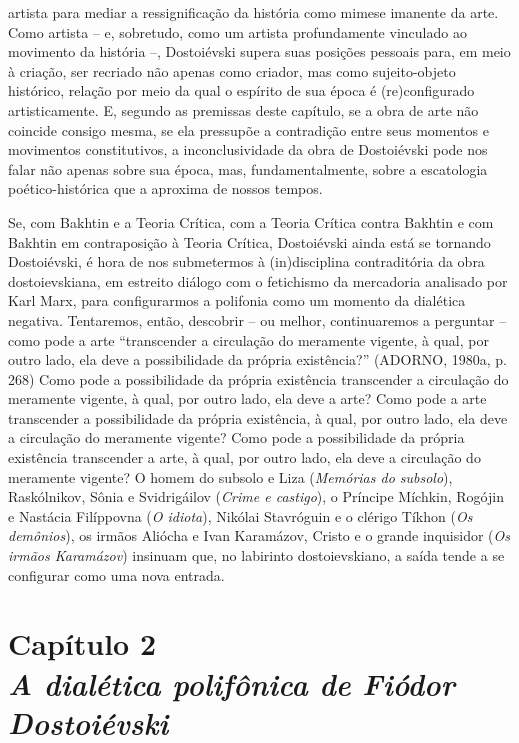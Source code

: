 artista para mediar a ressignificação da história como mimese imanente
da arte. Como artista -- e, sobretudo, como um artista profundamente
vinculado ao movimento da história --, Dostoiévski supera suas posições
pessoais para, em meio à criação, ser recriado não apenas como criador,
mas como sujeito-objeto histórico, relação por meio da qual o espírito
de sua época é (re)configurado artisticamente. E, segundo as premissas
deste capítulo, se a obra de arte não coincide consigo mesma, se ela
pressupõe a contradição entre seus momentos e movimentos constitutivos,
a inconclusividade da obra de Dostoiévski pode nos falar não apenas
sobre sua época, mas, fundamentalmente, sobre a escatologia
poético-histórica que a aproxima de nossos tempos.

Se, com Bakhtin e a Teoria Crítica, com a Teoria Crítica contra Bakhtin
e com Bakhtin em contraposição à Teoria Crítica, Dostoiévski ainda está
se tornando Dostoiévski, é hora de nos submetermos à (in)disciplina
contraditória da obra dostoievskiana, em estreito diálogo com o
fetichismo da mercadoria analisado por Karl Marx, para configurarmos a
polifonia como um momento da dialética negativa. Tentaremos, então,
descobrir -- ou melhor, continuaremos a perguntar -- como pode a arte
``transcender a circulação do meramente vigente, à qual, por outro lado,
ela deve a possibilidade da própria existência?'' (ADORNO, 1980a, p.
268) Como pode a possibilidade da própria existência transcender a
circulação do meramente vigente, à qual, por outro lado, ela deve a
arte? Como pode a arte transcender a possibilidade da própria
existência, à qual, por outro lado, ela deve a circulação do meramente
vigente? Como pode a possibilidade da própria existência transcender a
arte, à qual, por outro lado, ela deve a circulação do meramente
vigente? O homem do subsolo e Liza (\emph{Memórias do subsolo}),
Raskólnikov, Sônia e Svidrigáilov (\emph{Crime e castigo}), o Príncipe
Míchkin, Rogójin e Nastácia Filíppovna (\emph{O idiota}), Nikólai
Stavróguin e o clérigo Tíkhon (\emph{Os demônios}), os irmãos Aliócha e
Ivan Karamázov, Cristo e o grande inquisidor (\emph{Os irmãos
Karamázov}) insinuam que, no labirinto dostoievskiano, a saída tende a
se configurar como uma nova entrada.

\chapter*{Capítulo 2\\
\bigskip
\emph{A dialética polifônica de Fiódor Dostoiévski}}

